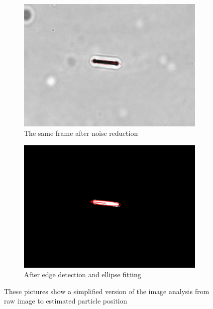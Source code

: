 \begin{figure}[H]
\begin{subfigure}[3a]{0.4\textwidth}
\includegraphics[width=\textwidth]{figures/method/static2.png}
\caption{The same frame after noise reduction}\label{fig:fixedFrame}
\end{subfigure}\hspace{1em}%
\begin{subfigure}[3a]{0.4\textwidth}
\includegraphics[width=\textwidth]{figures/method/edge.png}
\caption{After edge detection and ellipse fitting}\label{fig:edgeFrame}
\end{subfigure}

\caption{These pictures show a simplified version of the image analysis from raw image to estimated particle position}
\label{fig:detection}
\end{figure}

